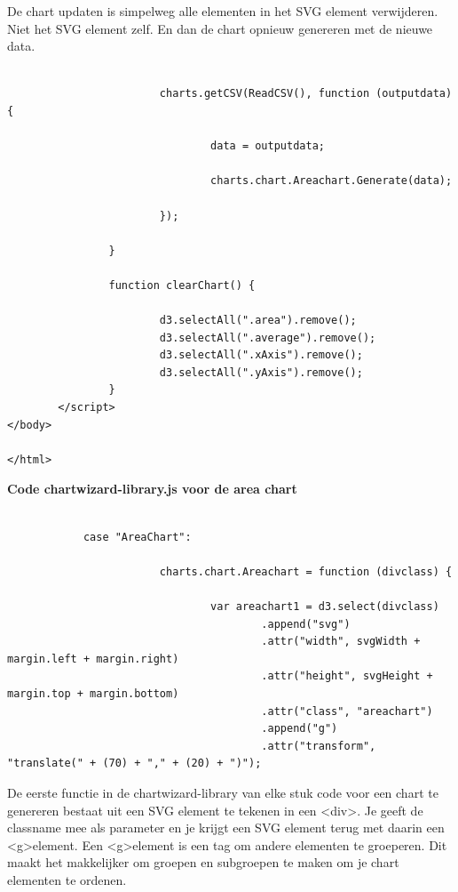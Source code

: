 De chart updaten is simpelweg alle elementen in het SVG element verwijderen. Niet het SVG element zelf. En dan de chart opnieuw genereren met de nieuwe data.

\begin{lstlisting}

                        charts.getCSV(ReadCSV(), function (outputdata) {

                                data = outputdata;

                                charts.chart.Areachart.Generate(data);

                        });

                }

                function clearChart() {

                        d3.selectAll(".area").remove();
                        d3.selectAll(".average").remove();
                        d3.selectAll(".xAxis").remove();
                        d3.selectAll(".yAxis").remove();
                }
        </script>
</body>

</html>
\end{lstlisting}

\textbf{Code chartwizard-library.js voor de area chart}
\begin{lstlisting}[gobble=16]

			case "AreaChart":

                        charts.chart.Areachart = function (divclass) {
							
                                var areachart1 = d3.select(divclass)
                                        .append("svg")
                                        .attr("width", svgWidth + margin.left + margin.right)
                                        .attr("height", svgHeight + margin.top + margin.bottom)
                                        .attr("class", "areachart")
                                        .append("g")
                                        .attr("transform", "translate(" + (70) + "," + (20) + ")");

\end{lstlisting}

De eerste functie in de chartwizard-library van elke stuk code voor een chart te genereren bestaat uit een SVG element te tekenen in een \textless div\textgreater. Je geeft de classname mee als parameter en je krijgt een SVG element terug met daarin een \textless g\textgreater element. Een \textless g\textgreater element is een tag om andere elementen te groeperen. Dit maakt het makkelijker om groepen en subgroepen te maken om je chart elementen te ordenen.

